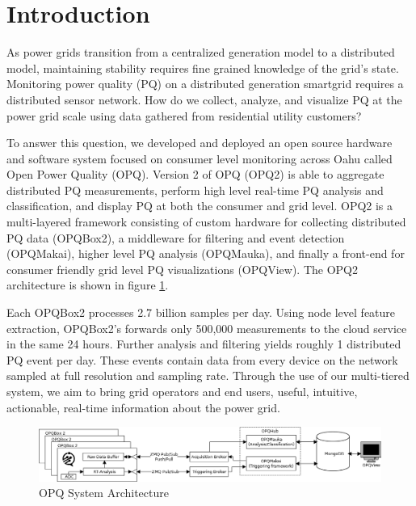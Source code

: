\documentclass[a4paper, conference]{IEEEtran}
\begin{document}
\section{Introduction}
As power grids transition from a centralized generation model to a distributed model, maintaining stability requires fine grained knowledge of the grid's state\cite{ECPAB}. Monitoring power quality (PQ) on a distributed generation smartgrid requires a distributed sensor network. How do we collect, analyze, and visualize PQ at the power grid scale using data gathered from residential utility customers? 

To answer this question, we developed and deployed an open source hardware and software system focused on consumer level monitoring across Oahu called Open Power Quality (OPQ). Version 2 of OPQ (OPQ2) is able to aggregate distributed PQ measurements, perform high level real-time PQ analysis and classification, and display PQ at both the consumer and grid level. OPQ2 is a multi-layered framework consisting of custom hardware for collecting distributed PQ data (OPQBox2), a middleware for filtering and event detection (OPQMakai), higher level PQ analysis (OPQMauka), and finally a front-end for consumer friendly grid level PQ visualizations (OPQView). The OPQ2 architecture is shown in figure \ref{fig:system-architecture}.


Each OPQBox2 processes 2.7 billion samples per day. Using node level feature extraction, OPQBox2's forwards only 500,000 measurements to the cloud service in the same 24 hours. Further analysis and filtering yields roughly 1 distributed PQ event per day. These events contain data from every device on the network sampled at full resolution and sampling rate.  Through the use of our multi-tiered system, we aim to bring grid operators and end users, useful, intuitive, actionable, real-time information about the power grid.


\begin{figure}[htb!]\label{fig:system-architecture}
    \centering
    \includegraphics[width=0.9\linewidth]{img/system-diagram}
    \caption{OPQ System Architecture}
\end{figure}
\end{document}
